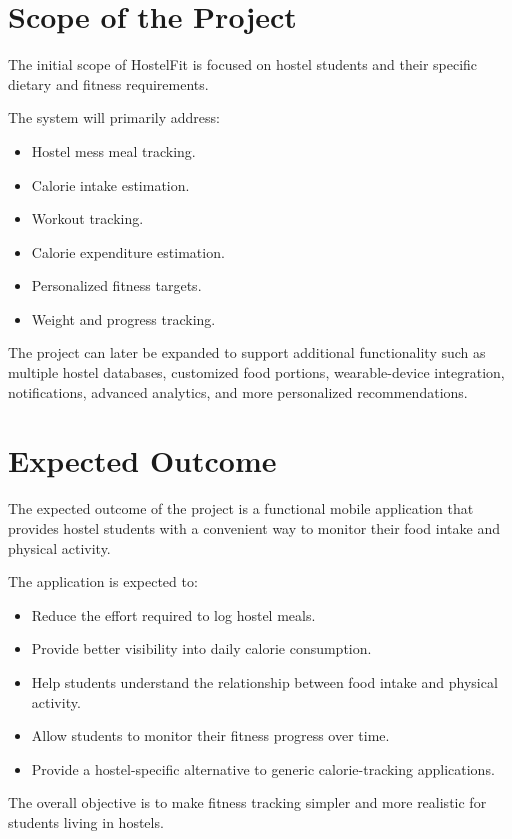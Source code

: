 \documentclass[11pt,a4paper]{article}
\begin{document}
\section{Scope of the Project}

The initial scope of HostelFit is focused on hostel students and their specific dietary and fitness requirements.

The system will primarily address:
\begin{itemize}
    \item Hostel mess meal tracking.
    \item Calorie intake estimation.
    \item Workout tracking.
    \item Calorie expenditure estimation.
    \item Personalized fitness targets.
    \item Weight and progress tracking.
\end{itemize}

The project can later be expanded to support additional functionality such as multiple hostel databases, customized food portions, wearable-device integration, notifications, advanced analytics, and more personalized recommendations.

\section{Expected Outcome}

The expected outcome of the project is a functional mobile application that provides hostel students with a convenient way to monitor their food intake and physical activity.

The application is expected to:
\begin{itemize}
    \item Reduce the effort required to log hostel meals.
    \item Provide better visibility into daily calorie consumption.
    \item Help students understand the relationship between food intake and physical activity.
    \item Allow students to monitor their fitness progress over time.
    \item Provide a hostel-specific alternative to generic calorie-tracking applications.
\end{itemize}

The overall objective is to make fitness tracking simpler and more realistic for students living in hostels.
\end{document}
